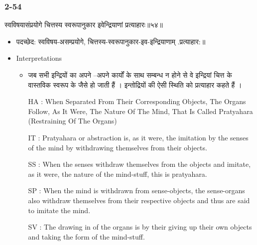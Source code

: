 \begin{frame}[fragile]\frametitle{2-54}
\begin{sanskrit}
स्वविषयासंप्रयोगे चित्तस्य स्वरूपानुकार इवेन्द्रियाणां प्रत्याहारः॥५४॥
\end{sanskrit}

	\begin{itemize}
	\item पदच्छेद: स्वविषय-असम्प्रयोगे, चित्तस्य-स्वरूपानुकार-इव-इन्द्रियाणाम् .प्रत्याहार:॥
	\item Interpretations
		\begin{itemize}
		\item जब सभी इन्द्रियों का अपने –अपने कार्यों के साथ सम्बन्ध न होने से वे इन्द्रियां चित्त के वास्तविक स्वरूप के जैसे हो जाती हैं । इन्तोद्रियों की ऐसी स्थिति को प्रत्याहार कहते हैं ।
		\item [HA]: When Separated From Their Corresponding Objects, The Organs Follow, As It Were, The Nature Of The Mind, That Is Called Pratyahara (Restraining Of The Organs)
		\item [IT]: Pratyahara or abstraction is, as it were, the imitation by the senses of the mind by withdrawing themselves from their objects.
		\item [SS]: When the senses withdraw themselves from the objects and imitate, as it were, the nature of the mind-stuff, this is pratyahara.
		\item [SP]: When the mind is withdrawn from sense-objects, the sense-organs also withdraw themselves from their respective objects and thus are said to imitate the mind.
		\item [SV]: The drawing in of the organs is by their giving up their own objects and taking the form of the mind-stuff.
		\end{itemize}
	\end{itemize}	
\end{frame}

